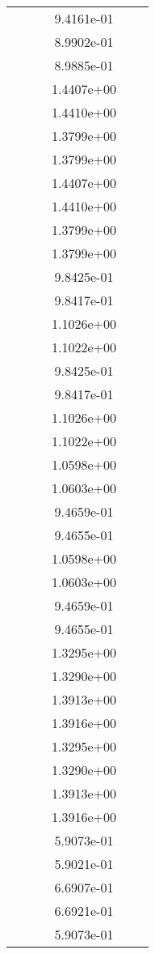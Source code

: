 \begin{xltabular}{\textwidth}{r|rS[table-format=1.3e+2]S[table-format=1.4e+2]S[table-format=1.4e+2]S[table-format=-1.5]}
&  &  & 9.4161e-01 & & \\
&  &  & 8.9902e-01 & & \\
&  &  & 8.9885e-01 & & \\
&  &  & 1.4407e+00 & & \\
&  &  & 1.4410e+00 & & \\
&  &  & 1.3799e+00 & & \\
&  &  & 1.3799e+00 & & \\
&  &  & 1.4407e+00 & & \\
&  &  & 1.4410e+00 & & \\
&  &  & 1.3799e+00 & & \\
&  &  & 1.3799e+00 & & \\
&  &  & 9.8425e-01 & & \\
&  &  & 9.8417e-01 & & \\
&  &  & 1.1026e+00 & & \\
&  &  & 1.1022e+00 & & \\
&  &  & 9.8425e-01 & & \\
&  &  & 9.8417e-01 & & \\
&  &  & 1.1026e+00 & & \\
&  &  & 1.1022e+00 & & \\
&  &  & 1.0598e+00 & & \\
&  &  & 1.0603e+00 & & \\
&  &  & 9.4659e-01 & & \\
&  &  & 9.4655e-01 & & \\
&  &  & 1.0598e+00 & & \\
&  &  & 1.0603e+00 & & \\
&  &  & 9.4659e-01 & & \\
&  &  & 9.4655e-01 & & \\
&  &  & 1.3295e+00 & & \\
&  &  & 1.3290e+00 & & \\
&  &  & 1.3913e+00 & & \\
&  &  & 1.3916e+00 & & \\
&  &  & 1.3295e+00 & & \\
&  &  & 1.3290e+00 & & \\
&  &  & 1.3913e+00 & & \\
&  &  & 1.3916e+00 & & \\
&  &  & 5.9073e-01 & & \\
&  &  & 5.9021e-01 & & \\
&  &  & 6.6907e-01 & & \\
&  &  & 6.6921e-01 & & \\
&  &  & 5.9073e-01 & & \\

\end{xltabular}
